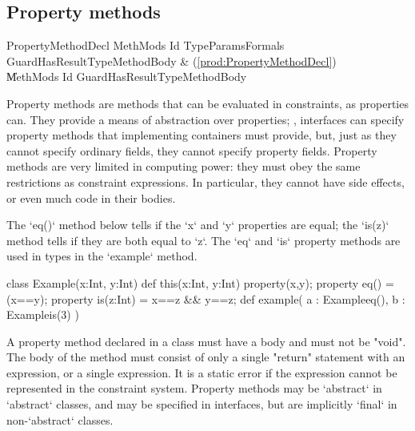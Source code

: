 

\subsection{Property methods}

\begin{bbgrammar}
  PropertyMethodDecl \: MethMods Id TypeParams\opt Formals Guard\opt HasResultType\opt MethodBody & (\ref{prod:PropertyMethodDecl}) \\
                     \| MethMods Id Guard\opt HasResultType\opt MethodBody \\
\end{bbgrammar}

Property methods are methods that can be evaluated in constraints, as
properties can.   They provide a means of abstraction over properties; \eg,
interfaces can specify property methods that implementing containers must
provide, but, just as they cannot specify ordinary fields, they cannot specify
property fields.   Property methods are very limited in computing power: they
must obey the same restrictions as constraint expressions.  In particular,
they cannot have side effects, or even much code in their bodies.


\begin{ex}
The \xcd`eq()` method below tells if the \xcd`x` and \xcd`y`
properties are equal; the \xcd`is(z)` method tells if they are both equal to
\xcd`z`.  
The \xcd`eq` and \xcd`is` property methods are used in types in the
\xcd`example` method.
\begin{xten}
class Example(x:Int, y:Int) {
   def this(x:Int, y:Int) { property(x,y); }
   property eq() = (x==y);
   property is(z:Int) = x==z && y==z;
   def example( a : Example{eq()}, b : Example{is(3)} ) {}
}
\end{xten}
%
\end{ex}

A property method declared in a class must have
a body and must not be \xcd"void".  The body of the method must
consist of only a single \xcd"return" statement with an expression,  or a single
expression.  It is a static error if the expression cannot be
represented in the constraint system.   Property methods may be \xcd`abstract`
in \xcd`abstract` classes, and may be specified in interfaces, but are
implicitly \xcd`final` in 
non-\xcd`abstract` classes. 

